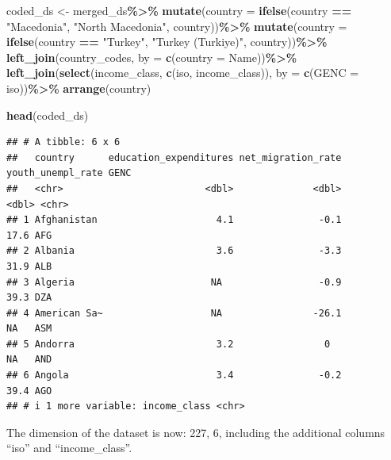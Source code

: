 \documentclass[
]{article}
\newenvironment{Shaded}{\begin{snugshade}}{\end{snugshade}}
\newcommand{\AttributeTok}[1]{\textcolor[rgb]{0.13,0.29,0.53}{#1}}
\newcommand{\FunctionTok}[1]{\textcolor[rgb]{0.13,0.29,0.53}{\textbf{#1}}}
\newcommand{\NormalTok}[1]{#1}
\newcommand{\OtherTok}[1]{\textcolor[rgb]{0.56,0.35,0.01}{#1}}
\newcommand{\SpecialCharTok}[1]{\textcolor[rgb]{0.81,0.36,0.00}{\textbf{#1}}}
\newcommand{\StringTok}[1]{\textcolor[rgb]{0.31,0.60,0.02}{#1}}
\begin{document}
\begin{Shaded}
\begin{Highlighting}[]
\NormalTok{coded\_ds }\OtherTok{\textless{}{-}}\NormalTok{ merged\_ds}\SpecialCharTok{\%\textgreater{}\%}
  \FunctionTok{mutate}\NormalTok{(}\AttributeTok{country =} \FunctionTok{ifelse}\NormalTok{(country }\SpecialCharTok{==} \StringTok{"Macedonia"}\NormalTok{, }\StringTok{"North Macedonia"}\NormalTok{, country))}\SpecialCharTok{\%\textgreater{}\%}
  \FunctionTok{mutate}\NormalTok{(}\AttributeTok{country =} \FunctionTok{ifelse}\NormalTok{(country }\SpecialCharTok{==} \StringTok{"Turkey"}\NormalTok{, }\StringTok{"Turkey (Turkiye)"}\NormalTok{, country))}\SpecialCharTok{\%\textgreater{}\%}
  \FunctionTok{left\_join}\NormalTok{(country\_codes, }\AttributeTok{by =} \FunctionTok{c}\NormalTok{(}\StringTok{\textquotesingle{}country\textquotesingle{}} \OtherTok{=} \StringTok{\textquotesingle{}Name\textquotesingle{}}\NormalTok{))}\SpecialCharTok{\%\textgreater{}\%}
  \FunctionTok{left\_join}\NormalTok{(}\FunctionTok{select}\NormalTok{(income\_class, }\FunctionTok{c}\NormalTok{(iso, income\_class)), }\AttributeTok{by =} \FunctionTok{c}\NormalTok{(}\StringTok{\textquotesingle{}GENC\textquotesingle{}} \OtherTok{=} \StringTok{\textquotesingle{}iso\textquotesingle{}}\NormalTok{))}\SpecialCharTok{\%\textgreater{}\%}
  \FunctionTok{arrange}\NormalTok{(country)}

\FunctionTok{head}\NormalTok{(coded\_ds)}
\end{Highlighting}
\end{Shaded}

\begin{verbatim}
## # A tibble: 6 x 6
##   country      education_expenditures net_migration_rate youth_unempl_rate GENC 
##   <chr>                         <dbl>              <dbl>             <dbl> <chr>
## 1 Afghanistan                     4.1               -0.1              17.6 AFG  
## 2 Albania                         3.6               -3.3              31.9 ALB  
## 3 Algeria                        NA                 -0.9              39.3 DZA  
## 4 American Sa~                   NA                -26.1              NA   ASM  
## 5 Andorra                         3.2                0                NA   AND  
## 6 Angola                          3.4               -0.2              39.4 AGO  
## # i 1 more variable: income_class <chr>
\end{verbatim}

The dimension of the dataset is now: 227, 6, including the additional
columns ``iso'' and ``income\_class''.
\end{document}
